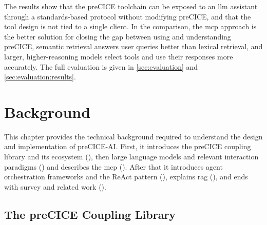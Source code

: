 \documentclass[
  numbers=noenddot,
  english,
  a4paper,
  twoside,
  bibliography=totoc,
  headsepline,
  cleardoublepage=empty,
  parskip=half,
  draft=false
]{scrbook}
\theoremstyle{break}
\renewcommand{\_}{\textunderscore\allowbreak}
\begin{document}
The results show that the preCICE toolchain can be exposed to an \gls{llm} assistant through a
standards-based protocol without modifying preCICE, and that the tool design is not tied to a single client.
In the comparison, the \gls{mcp} approach is the better solution for closing the gap between using and
understanding preCICE, semantic retrieval answers user queries better than lexical retrieval,
and larger, higher-reasoning models select tools and use their responses more accurately.
The full evaluation is given in \cref{sec:evaluation} and \cref{sec:evaluation:results}.


\chapter{Background}\label{sec:background}

This chapter provides the technical background required to understand the design and
implementation of preCICE-AI. First, it introduces the preCICE coupling library and 
its ecosystem (), then large language models and relevant 
interaction paradigms () and describes the \gls{mcp} ().
After that it introduces agent orchestration frameworks and the ReAct pattern (), explains \gls{rag} (), and ends with 
survey and related work ().


\section{The preCICE Coupling Library}\label{sec:background:precice}
\end{document}
